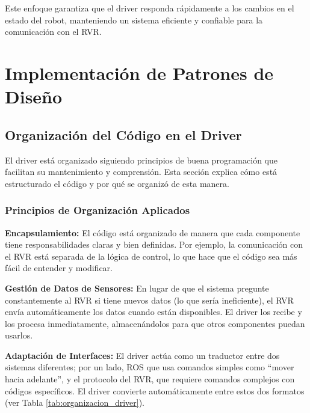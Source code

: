 \documentclass[11pt]{article}
\numberwithin{figure}{section}
\numberwithin{table}{section}
\begin{document}
Este enfoque garantiza que el driver responda rápidamente a los cambios en el estado del robot, manteniendo un sistema eficiente y confiable para la comunicación con el RVR.


\newpage


\section{Implementación de Patrones de Diseño}
\label{sec:patrones_diseno}


\subsection{Organización del Código en el Driver}

El driver está organizado siguiendo principios de buena programación que facilitan su mantenimiento y comprensión. Esta sección explica cómo está estructurado el código y por qué se organizó de esta manera.


\subsubsection{Principios de Organización Aplicados}

\textbf{Encapsulamiento:} El código está organizado de manera que cada componente tiene responsabilidades claras y bien definidas. Por ejemplo, la comunicación con el RVR está separada de la lógica de control, lo que hace que el código sea más fácil de entender y modificar.

\textbf{Gestión de Datos de Sensores:} En lugar de que el sistema pregunte constantemente al RVR si tiene nuevos datos (lo que sería ineficiente), el RVR envía automáticamente los datos cuando están disponibles. El driver los recibe y los procesa inmediatamente, almacenándolos para que otros componentes puedan usarlos.

\textbf{Adaptación de Interfaces:} El driver actúa como un traductor entre dos sistemas diferentes; por un lado, ROS que usa comandos simples como ``mover hacia adelante'', y el protocolo del RVR, que requiere comandos complejos con códigos específicos. El driver convierte automáticamente entre estos dos formatos (ver Tabla \ref{tab:organizacion_driver}).
\end{document}
